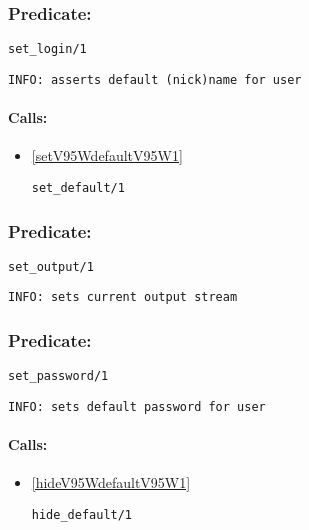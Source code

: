 \subsubsection{Predicate:} \label{setV95WloginV95W1}

\begin{verbatim}
set_login/1
\end{verbatim}

{\small \begin{verbatim}
INFO: asserts default (nick)name for user

\end{verbatim}}
\paragraph{Calls:} 
\begin{itemize}
\item \ref{setV95WdefaultV95W1} 
\begin{verbatim}
set_default/1
\end{verbatim}

\end{itemize}

\subsubsection{Predicate:} \label{setV95WoutputV95W1}

\begin{verbatim}
set_output/1
\end{verbatim}

{\small \begin{verbatim}
INFO: sets current output stream

\end{verbatim}}

\subsubsection{Predicate:} \label{setV95WpasswordV95W1}

\begin{verbatim}
set_password/1
\end{verbatim}

{\small \begin{verbatim}
INFO: sets default password for user

\end{verbatim}}
\paragraph{Calls:} 
\begin{itemize}
\item \ref{hideV95WdefaultV95W1} 
\begin{verbatim}
hide_default/1
\end{verbatim}

\end{itemize}

